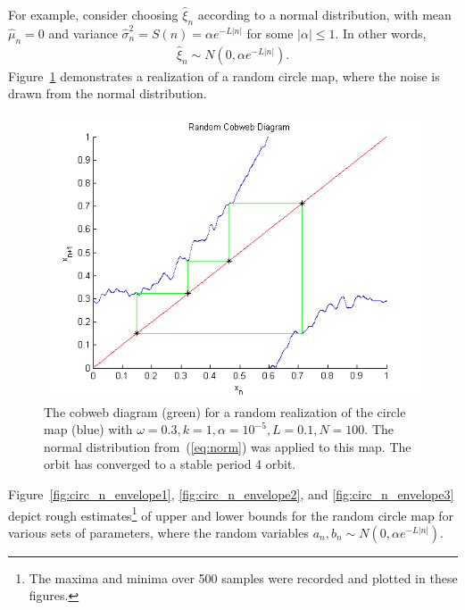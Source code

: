 For example, consider choosing $\hat{\xi}_n$ according to a normal
distribution, with mean $\hat{\mu}_n=0$ and variance $\hat{\sigma}_n^2 =
S(n) = \alpha e^{-L|n|}$ for some $|\alpha| \leq 1$. In other words, 
\begin{align}\label{eq:norm}
\hat{\xi}_n\sim N(0,\alpha e^{-L|n|}). 
\end{align}
Figure~\ref{fig:rcircstable_norm} demonstrates a realization of a random circle
map, where the noise is drawn from the normal distribution.
\begin{figure}[!h]
\caption[Random circle map, stable orbit under the Normal distribution]{The cobweb
  diagram (green) for a random realization of the circle map (blue) with $\omega =
  0.3, k=1, \alpha = 10^{-5}, L=0.1, N=100$. The normal distribution
  from~(\ref{eq:norm}) was applied to this map. The orbit has converged to a stable period 4 orbit. }\label{fig:rcircstable_norm}
	\begin{center}
		\includegraphics[scale=0.7]{figs/randcirc_norm_cobweb.png}
	\end{center}
\end{figure}
Figure~\ref{fig:circ_n_envelope1}, \ref{fig:circ_n_envelope2}, and \ref{fig:circ_n_envelope3} depict rough estimates\footnote{The
  maxima and minima over 500 samples were recorded and plotted in
  these figures.} of upper and lower bounds for the random circle map
for various sets of parameters, where the random variables
$a_n,b_n\sim N(0,\alpha e^{-L|n|})$.
